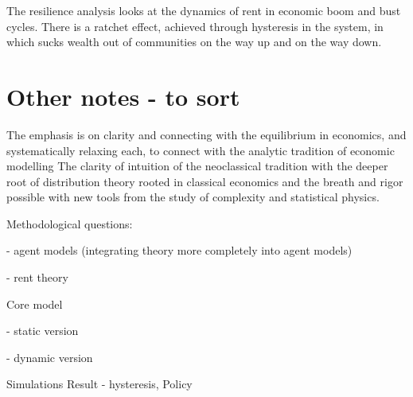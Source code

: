 The resilience analysis looks at the dynamics of rent in economic boom and bust cycles.
There is a ratchet effect, achieved through hysteresis in the system, in which sucks wealth out of communities on the way up and on the way down. %


\section{Other notes - to sort}


The emphasis is on clarity and connecting with the equilibrium in economics, and systematically relaxing each, to connect with the analytic tradition of economic modelling
The clarity of intuition of the neoclassical tradition with the deeper root of distribution theory rooted in classical economics and the breath and rigor possible with new tools from the study of complexity and statistical physics.

Methodological questions: 

    - agent models (integrating theory more completely into agent models)
    
    - rent theory

Core model

    - static version
    
    - dynamic version

Simulations
Result - hysteresis,
Policy
